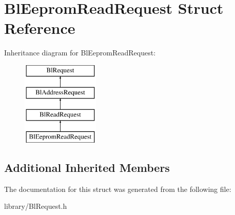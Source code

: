 \hypertarget{struct_bl_eeprom_read_request}{\section{Bl\-Eeprom\-Read\-Request Struct Reference}
\label{struct_bl_eeprom_read_request}
}
Inheritance diagram for Bl\-Eeprom\-Read\-Request\-:\begin{figure}[H]
\begin{center}
\leavevmode
\includegraphics[height=4.000000cm]{struct_bl_eeprom_read_request}
\end{center}
\end{figure}
\subsection*{Additional Inherited Members}


The documentation for this struct was generated from the following file\-:\begin{DoxyCompactItemize}
\item 
library/Bl\-Request.\-h\end{DoxyCompactItemize}
